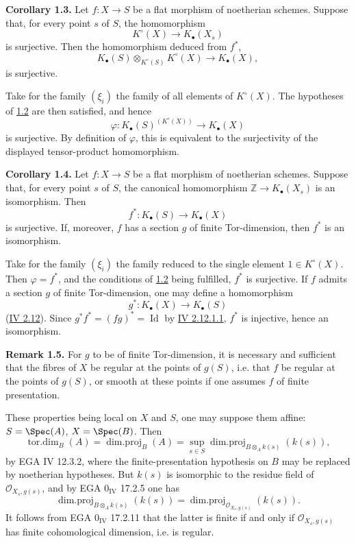 \textbf{Corollary 1.3.} Let $f:X\to S$ be a flat morphism of noetherian schemes. Suppose that, for every point $s$ of $S$, the homomorphism
\[
 K^\circ(X)\longrightarrow K_\bullet(X_s)
\]
is surjective. Then the homomorphism deduced from $f^*$,
\[
 K_\bullet(S)\otimes_{K^\circ(S)}K^\circ(X)\longrightarrow K_\bullet(X),
\]
is surjective.

Take for the family $(\xi_i)$ the family of all elements of $K^\circ(X)$. The hypotheses of \hyperlink{sga6.e09.prop.1-2}{1.2} are then satisfied, and hence
\[
 \varphi:K_\bullet(S)^{(K^\circ(X))}\longrightarrow K_\bullet(X)
\]
is surjective. By definition of $\varphi$, this is equivalent to the surjectivity of the displayed tensor-product homomorphism.

\textbf{Corollary 1.4.} Let $f:X\to S$ be a flat morphism of noetherian schemes. Suppose that, for every point $s$ of $S$, the canonical homomorphism $\mathbb Z\to K_\bullet(X_s)$ is an isomorphism. Then
\[
 f^*:K_\bullet(S)\longrightarrow K_\bullet(X)
\]
is surjective. If, moreover, $f$ has a section $g$ of finite Tor-dimension, then $f^*$ is an isomorphism.

Take for the family $(\xi_i)$ the family reduced to the single element $1\in K^\circ(X)$. Then $\varphi=f^*$, and the conditions of \hyperlink{sga6.e09.prop.1-2}{1.2} being fulfilled, $f^*$ is surjective. If $f$ admits a section $g$ of finite Tor-dimension, one may define a homomorphism
\[
 g^*:K_\bullet(X)\longrightarrow K_\bullet(S)
\]
(\hyperlink{sga6.e04.para.2-12}{IV 2.12}). Since $g^*f^*=(fg)^*=\operatorname{Id}$ by \hyperlink{sga6.e04.eq.2-12-1-1}{IV 2.12.1.1}, $f^*$ is injective, hence an isomorphism.

\textbf{Remark 1.5.} For $g$ to be of finite Tor-dimension, it is necessary and sufficient that the fibres of $X$ be regular at the points of $g(S)$, i.e. that $f$ be regular at the points of $g(S)$, or smooth at these points if one assumes $f$ of finite presentation.

These properties being local on $X$ and $S$, one may suppose them affine: $S=\Spec(A)$, $X=\Spec(B)$. Then
\[
 \operatorname{tor.dim}_B(A)=\operatorname{dim.proj}_B(A)=\sup_{s\in S}\operatorname{dim.proj}_{B\otimes_A k(s)}(k(s)),
\]
by EGA IV 12.3.2, where the finite-presentation hypothesis on $B$ may be replaced by noetherian hypotheses. But $k(s)$ is isomorphic to the residue field of $\mathcal O_{X_s,g(s)}$, and by EGA $0_{\mathrm{IV}}$ 17.2.5 one has
\[
 \operatorname{dim.proj}_{B\otimes_A k(s)}(k(s))=
 \operatorname{dim.proj}_{\mathcal O_{X_s,g(s)}}(k(s)).
\]
It follows from EGA $0_{\mathrm{IV}}$ 17.2.11 that the latter is finite if and only if $\mathcal O_{X_s,g(s)}$ has finite cohomological dimension, i.e. is regular.


